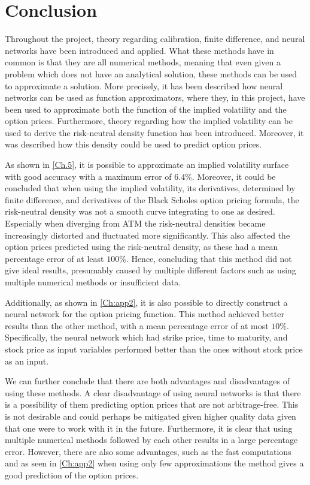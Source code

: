 \chapter{Conclusion}\label{Ch.Conclusion}
Throughout the project, theory regarding calibration, finite difference, and neural networks have been introduced and applied. What these methods have in common is that they are all numerical methods, meaning that even given a problem which does not have an analytical solution, these methods can be used to approximate a solution. More precisely, it has been described how neural networks can be used as function approximators, where they, in this project, have been used to approximate both the function of the implied volatility and the option prices. Furthermore, theory regarding how the implied volatility can be used to derive the risk-neutral density function has been introduced. Moreover, it was described how this density could be used to predict option prices. 

As shown in \autoref{Ch.5}, it is possible to approximate an implied volatility surface with good accuracy with a maximum error of $6.4\%$. Moreover, it could be concluded that when using the implied volatility, its derivatives, determined by finite difference, and derivatives of the Black Scholes option pricing formula, the risk-neutral density was not a smooth curve integrating to one as desired. Especially when diverging from ATM the risk-neutral densities became increasingly distorted and fluctuated more significantly. This also affected the option prices predicted using the risk-neutral density, as these had a mean percentage error of at least $100\%$. Hence, concluding that this method did not give ideal results, presumably caused by multiple different factors such as using multiple numerical methods or insufficient data.

Additionally, as shown in \autoref{Ch:app2}, it is also possible to directly construct a neural network for the option pricing function. This method achieved better results than the other method, with a mean percentage error of at most $10\%$. Specifically, the neural network which had strike price, time to maturity, and stock price as input variables performed better than the ones without stock price as an input.

We can further conclude that there are both advantages and disadvantages of using these methods. A clear disadvantage of using neural networks is that there is a possibility of them predicting option prices that are not arbitrage-free. This is not desirable and could perhaps be mitigated given higher quality data given that one were to work with it in the future. Furthermore, it is clear that using multiple numerical methods followed by each other results in a large percentage error. However, there are also some advantages, such as the fast computations and as seen in \autoref{Ch:app2} when using only few approximations the method gives a good prediction of the option prices. 

